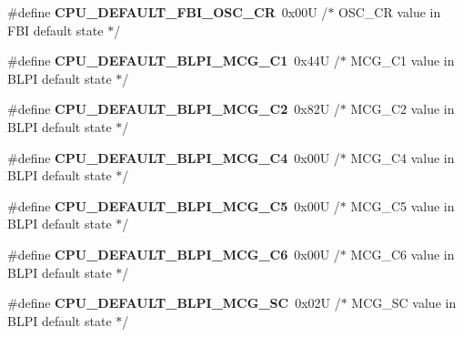 \begin{DoxyCompactItemize}
\item 
\#define {\bfseries C\+P\+U\+\_\+\+D\+E\+F\+A\+U\+L\+T\+\_\+\+F\+B\+I\+\_\+\+O\+S\+C\+\_\+\+CR}~0x00\+U     /$\ast$ O\+S\+C\+\_\+\+C\+R value in F\+B\+I default state $\ast$/\hypertarget{group___c_p_u___config__module_ga13b1545866474e30f6d8952a169d02bb}{}\label{group___c_p_u___config__module_ga13b1545866474e30f6d8952a169d02bb}

\item 
\#define {\bfseries C\+P\+U\+\_\+\+D\+E\+F\+A\+U\+L\+T\+\_\+\+B\+L\+P\+I\+\_\+\+M\+C\+G\+\_\+\+C1}~0x44\+U     /$\ast$ M\+C\+G\+\_\+\+C1 value in B\+L\+P\+I default state $\ast$/\hypertarget{group___c_p_u___config__module_ga76656e58a85a15581fb470114b5bd8f1}{}\label{group___c_p_u___config__module_ga76656e58a85a15581fb470114b5bd8f1}

\item 
\#define {\bfseries C\+P\+U\+\_\+\+D\+E\+F\+A\+U\+L\+T\+\_\+\+B\+L\+P\+I\+\_\+\+M\+C\+G\+\_\+\+C2}~0x82\+U     /$\ast$ M\+C\+G\+\_\+\+C2 value in B\+L\+P\+I default state $\ast$/\hypertarget{group___c_p_u___config__module_ga82ccf741ab9415525ab8488ed818945e}{}\label{group___c_p_u___config__module_ga82ccf741ab9415525ab8488ed818945e}

\item 
\#define {\bfseries C\+P\+U\+\_\+\+D\+E\+F\+A\+U\+L\+T\+\_\+\+B\+L\+P\+I\+\_\+\+M\+C\+G\+\_\+\+C4}~0x00\+U     /$\ast$ M\+C\+G\+\_\+\+C4 value in B\+L\+P\+I default state $\ast$/\hypertarget{group___c_p_u___config__module_ga7445465a5a7368c154a589c5d6e0f580}{}\label{group___c_p_u___config__module_ga7445465a5a7368c154a589c5d6e0f580}

\item 
\#define {\bfseries C\+P\+U\+\_\+\+D\+E\+F\+A\+U\+L\+T\+\_\+\+B\+L\+P\+I\+\_\+\+M\+C\+G\+\_\+\+C5}~0x00\+U     /$\ast$ M\+C\+G\+\_\+\+C5 value in B\+L\+P\+I default state $\ast$/\hypertarget{group___c_p_u___config__module_ga82275c9d74a7d38023127119582bf261}{}\label{group___c_p_u___config__module_ga82275c9d74a7d38023127119582bf261}

\item 
\#define {\bfseries C\+P\+U\+\_\+\+D\+E\+F\+A\+U\+L\+T\+\_\+\+B\+L\+P\+I\+\_\+\+M\+C\+G\+\_\+\+C6}~0x00\+U     /$\ast$ M\+C\+G\+\_\+\+C6 value in B\+L\+P\+I default state $\ast$/\hypertarget{group___c_p_u___config__module_ga0b36c9f1c3a9510d14a0a254ddd79fbc}{}\label{group___c_p_u___config__module_ga0b36c9f1c3a9510d14a0a254ddd79fbc}

\item 
\#define {\bfseries C\+P\+U\+\_\+\+D\+E\+F\+A\+U\+L\+T\+\_\+\+B\+L\+P\+I\+\_\+\+M\+C\+G\+\_\+\+SC}~0x02\+U     /$\ast$ M\+C\+G\+\_\+\+S\+C value in B\+L\+P\+I default state $\ast$/\hypertarget{group___c_p_u___config__module_gabe248bc00afc874d2134655d91d2d0c4}{}\label{group___c_p_u___config__module_gabe248bc00afc874d2134655d91d2d0c4}


\end{DoxyCompactItemize}

